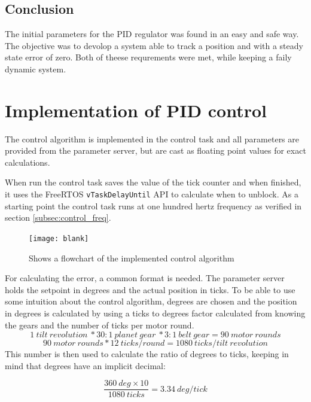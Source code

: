 \subsection{Conclusion}
The initial parameters for the PID regulator was found in an easy and safe way. The objective was to devolop a system able to track a position and with a steady state error of zero. Both of theese requrements were met, while keeping a faily dynamic system.


\section{Implementation of PID control}
The control algorithm is implemented in the control task and all parameters are provided from the parameter server, but are cast as  floating point values for exact calculations.

When run the control task saves the value of the tick counter and when finished, it uses the FreeRTOS \texttt{vTaskDelayUntil} API to calculate when to unblock. As a starting point the control task runs at one hundred hertz frequency as verified in section \ref{subsec:control_freq}.

\begin{figure}[htb]
	\centering
	\texttt{[image: blank]}
	\caption{Shows a flowchart of the implemented control algorithm}
	\label{fig:pid_flow}			
\end{figure}

For calculating the error, a common format is needed. The parameter server holds the setpoint in degrees and the actual position in ticks. To be able to use some intuition about the control algorithm, degrees are chosen and the position in degrees is calculated by using a ticks to degrees factor calculated from knowing the gears and the number of ticks per motor round.
\begin{equation}
1 \ tilt \ revolution \ * 30:1 \ planet \ gear \ * 3:1 \ belt \ gear = 90 \ motor \ rounds
\end{equation}
\begin{equation}
 90 \ motor \ rounds * 12 \ ticks/round = 1080 \ ticks/tilt \ revolution
\end{equation}
This number is then used to calculate the ratio of degrees to ticks, keeping in mind that degrees have an implicit decimal:

\begin{equation}
\frac{360 \ deg \times 10}{1080 \ ticks} = 3.34\ deg/tick 
\end{equation}

